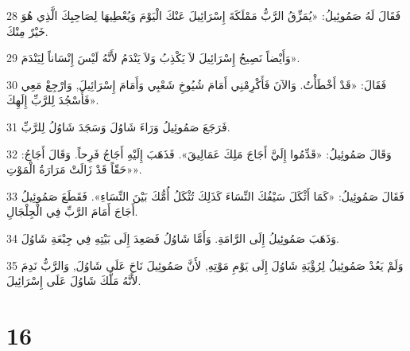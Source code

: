 \par 28 فَقَالَ لَهُ صَمُوئِيلُ: «يُمَزِّقُ الرَّبُّ مَمْلَكَةَ إِسْرَائِيلَ عَنْكَ الْيَوْمَ وَيُعْطِيهَا لِصَاحِبِكَ الَّذِي هُوَ خَيْرٌ مِنْكَ.
\par 29 وَأَيْضاً نَصِيحُ إِسْرَائِيلَ لاَ يَكْذِبُ وَلاَ يَنْدَمُ لأَنَّهُ لَيْسَ إِنْسَاناً لِيَنْدَمَ».
\par 30 فَقَالَ: «قَدْ أَخْطَأْتُ. وَالآنَ فَأَكْرِمْنِي أَمَامَ شُيُوخِ شَعْبِي وَأَمَامَ إِسْرَائِيلَ, وَارْجِعْ مَعِي فَأَسْجُدَ لِلرَّبِّ إِلَهِكَ».
\par 31 فَرَجَعَ صَمُوئِيلُ وَرَاءَ شَاوُلَ وَسَجَدَ شَاوُلُ لِلرَّبِّ.
\par 32 وَقَالَ صَمُوئِيلُ: «قَدِّمُوا إِلَيَّ أَجَاجَ مَلِكَ عَمَالِيقَ». فَذَهَبَ إِلَيْهِ أَجَاجُ فَرِحاً. وَقَالَ أَجَاجُ: «حَقّاً قَدْ زَالَتْ مَرَارَةُ الْمَوْتِ».
\par 33 فَقَالَ صَمُوئِيلُ: «كَمَا أَثْكَلَ سَيْفُكَ النِّسَاءَ كَذَلِكَ تُثْكَلُ أُمُّكَ بَيْنَ النِّسَاءِ». فَقَطَعَ صَمُوئِيلُ أَجَاجَ أَمَامَ الرَّبِّ فِي الْجِلْجَالِ.
\par 34 وَذَهَبَ صَمُوئِيلُ إِلَى الرَّامَةِ. وَأَمَّا شَاوُلُ فَصَعِدَ إِلَى بَيْتِهِ فِي جِبْعَةِ شَاوُلَ.
\par 35 وَلَمْ يَعُدْ صَمُوئِيلُ لِرُؤْيَةِ شَاوُلَ إِلَى يَوْمِ مَوْتِهِ, لأَنَّ صَمُوئِيلَ نَاحَ عَلَى شَاوُلَ, وَالرَّبُّ نَدِمَ لأَنَّهُ مَلَّكَ شَاوُلَ عَلَى إِسْرَائِيلَ.

\chapter{16}

